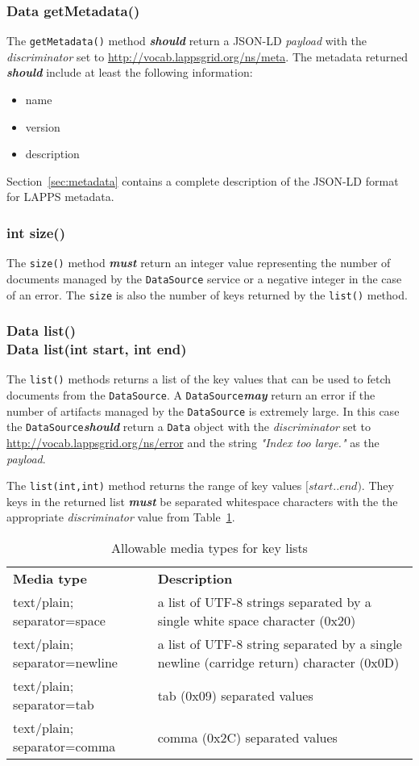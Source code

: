 \documentclass{article}
\newcommand{\lapps}{LAPPS\xspace}
\newcommand{\data}{\texttt{Data}\xspace}
\newcommand{\source}{\texttt{DataSource}\xspace}
\newcommand{\discriminator}{\textit{discriminator}\xspace}
\newcommand{\payload}{\textit{payload}\xspace}
\newcommand{\ns}[1]{\url{http://vocab.lappsgrid.org/ns/#1}}
\newcommand{\definedterm}[1]{\textbf{\textit{#1}}\xspace}
\newcommand{\must}{\definedterm{must}}
\newcommand{\should}{\definedterm{should}}
\newcommand{\may}{\definedterm{may}}
\renewcommand{\tt}[1]{\texttt{#1}}
\newcommand{\bold}[1]{\textbf{#1}}
\newenvironment{listing}{
\begin{itemize}
  \setlength{\itemsep}{1pt}
  \setlength{\parskip}{0pt}
  \setlength{\parsep}{0pt}
}{\end{itemize}}
\begin{document}
\subsubsection{Data getMetadata()}

The \tt{getMetadata()} method \should return a JSON-LD \payload with the \discriminator set to \ns{meta}. The metadata returned \should include at least the following information:
\begin{listing}
	\item name
	\item version
	\item description
\end{listing}
Section~\ref{sec:metadata} contains a complete description of the JSON-LD format for \lapps metadata.

\subsubsection{int size()}
The \tt{size()} method \must return an integer value representing the number of documents managed by the \source service or a negative integer in the case of an error.  The \tt{size} is also the number of keys returned by the \tt{list()} method.

\subsubsection{Data list()\\Data list(int start, int end)}

The \tt{list()} methods returns a list of the key values that can be used to fetch documents from the \source.  A \source \may return an error if the number of artifacts managed by the \source is extremely large.  In this case the \source \should return a \data object with the \discriminator set to \ns{error} and the string \emph{"Index too large."} as the \payload.

The \tt{list(int,int)} method  returns the range of key values $[start..end)$.  They keys in the returned list \must be separated  whitespace characters with the the appropriate \discriminator value from Table~\ref{table:list}.

\begin{table}[h!]
\noindent\begin{tabular}{ l p{7.5cm} }
\bold{Media type} & \bold{Description} \\
text/plain; separator=space & a list of UTF-8 strings separated by a single white space character (0x20) \\
text/plain; separator=newline & a list of UTF-8 string separated by a single newline (carridge return) character (0x0D) \\
text/plain; separator=tab & tab (0x09) separated values \\
text/plain; separator=comma  & comma (0x2C) separated values \\
\end{tabular}
\caption{Allowable media types for key lists}
\label{table:list}
\end{table}
\end{document}
